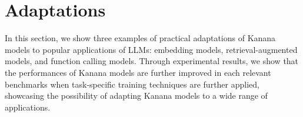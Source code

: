 \section{Adaptations}

In this section, we show three examples of practical adaptations of Kanana models to popular applications of LLMs: embedding models, retrieval-augmented models, and function calling models.
Through experimental results, we show that the performances of Kanana models are further improved in each relevant benchmarks when task-specific training techniques are further applied, showcasing the possibility of adapting Kanana models to a wide range of applications.



